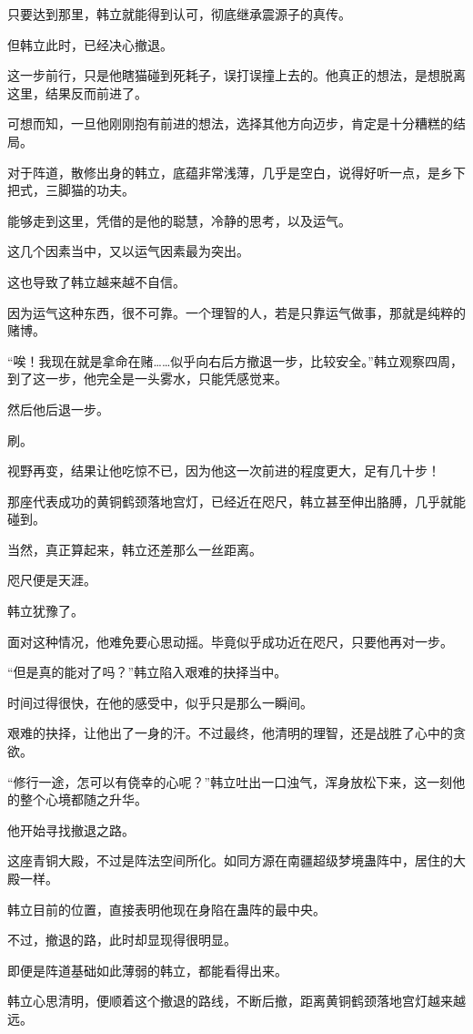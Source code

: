 \begin{this_body}
只要达到那里，韩立就能得到认可，彻底继承震源子的真传。

但韩立此时，已经决心撤退。

这一步前行，只是他瞎猫碰到死耗子，误打误撞上去的。他真正的想法，是想脱离这里，结果反而前进了。

可想而知，一旦他刚刚抱有前进的想法，选择其他方向迈步，肯定是十分糟糕的结局。

对于阵道，散修出身的韩立，底蕴非常浅薄，几乎是空白，说得好听一点，是乡下把式，三脚猫的功夫。

能够走到这里，凭借的是他的聪慧，冷静的思考，以及运气。

这几个因素当中，又以运气因素最为突出。

这也导致了韩立越来越不自信。

因为运气这种东西，很不可靠。一个理智的人，若是只靠运气做事，那就是纯粹的赌博。

“唉！我现在就是拿命在赌……似乎向右后方撤退一步，比较安全。”韩立观察四周，到了这一步，他完全是一头雾水，只能凭感觉来。

然后他后退一步。

刷。

视野再变，结果让他吃惊不已，因为他这一次前进的程度更大，足有几十步！

那座代表成功的黄铜鹤颈落地宫灯，已经近在咫尺，韩立甚至伸出胳膊，几乎就能碰到。

当然，真正算起来，韩立还差那么一丝距离。

咫尺便是天涯。

韩立犹豫了。

面对这种情况，他难免要心思动摇。毕竟似乎成功近在咫尺，只要他再对一步。

“但是真的能对了吗？”韩立陷入艰难的抉择当中。

时间过得很快，在他的感受中，似乎只是那么一瞬间。

艰难的抉择，让他出了一身的汗。不过最终，他清明的理智，还是战胜了心中的贪欲。

“修行一途，怎可以有侥幸的心呢？”韩立吐出一口浊气，浑身放松下来，这一刻他的整个心境都随之升华。

他开始寻找撤退之路。

这座青铜大殿，不过是阵法空间所化。如同方源在南疆超级梦境蛊阵中，居住的大殿一样。

韩立目前的位置，直接表明他现在身陷在蛊阵的最中央。

不过，撤退的路，此时却显现得很明显。

即便是阵道基础如此薄弱的韩立，都能看得出来。

韩立心思清明，便顺着这个撤退的路线，不断后撤，距离黄铜鹤颈落地宫灯越来越远。


\end{this_body}
